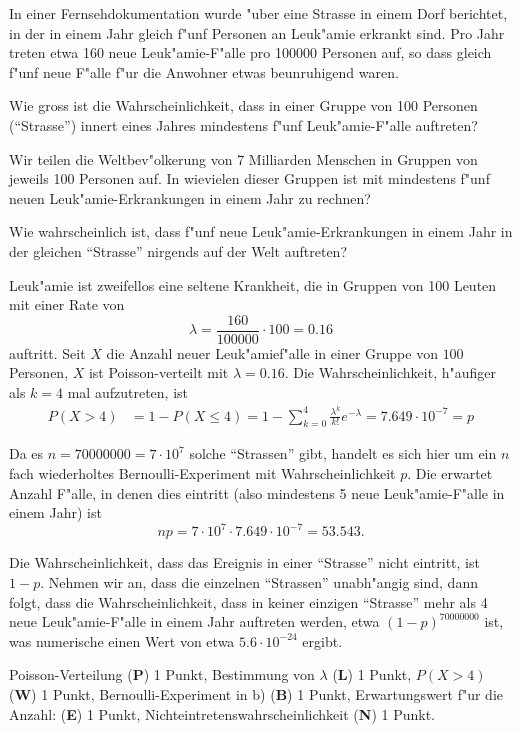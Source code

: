 In einer Fernsehdokumentation wurde "uber eine Strasse in einem Dorf berichtet,
in der in einem Jahr gleich f"unf Personen an Leuk"amie erkrankt sind.
Pro Jahr treten etwa 160 neue Leuk"amie-F"alle pro 100000 Personen auf,
so dass gleich f"unf neue F"alle f"ur die Anwohner etwas beunruhigend
waren.
\begin{teilaufgaben}
\item
Wie gross ist die Wahrscheinlichkeit, dass in einer Gruppe von
100 Personen (``Strasse'') innert eines Jahres mindestens f"unf
Leuk"amie-F"alle auftreten?
\item
Wir teilen die Weltbev"olkerung von 7 Milliarden Menschen
in Gruppen von jeweils 100 Personen auf.
In wievielen dieser Gruppen ist mit mindestens f"unf neuen
Leuk"amie-Erkrankungen in einem Jahr zu rechnen?
\item
Wie wahrscheinlich ist, dass f"unf neue Leuk"amie-Erkrankungen in einem 
Jahr in der gleichen ``Strasse'' nirgends auf der Welt auftreten?
\end{teilaufgaben}

\begin{loesung}
\begin{teilaufgaben}
\item
Leuk"amie ist zweifellos eine seltene Krankheit, die in Gruppen von 
100 Leuten mit einer Rate von 
\[
\lambda = \frac{160}{100000}\cdot 100=0.16
\]
auftritt.
Seit $X$ die Anzahl neuer Leuk"amief"alle in einer Gruppe von $100$
Personen, $X$ ist Poisson-verteilt mit $\lambda=0.16$.
Die Wahrscheinlichkeit, h"aufiger als $k=4$ mal aufzutreten, ist
\begin{align*}
P(X>4)
&=
1-P(X\le 4)
=
1-\sum_{k=0}^4 \frac{\lambda^k}{k!}e^{-\lambda}
=
7.649\cdot10^{-7}=p
\end{align*}
\item
Da es $n=70000000=7\cdot 10^7$ solche ``Strassen'' gibt, handelt es sich hier um
ein $n$ fach wiederholtes Bernoulli-Experiment mit Wahrscheinlichkeit $p$.
Die erwartet Anzahl F"alle, in denen dies eintritt (also mindestens 5
neue Leuk"amie-F"alle in einem Jahr) ist
\[
np=7\cdot 10^7\cdot 7.649\cdot 10^{-7}=53.543.
\]
\item
Die Wahrscheinlichkeit, dass das Ereignis in einer ``Strasse'' nicht eintritt,
ist $1-p$.
Nehmen wir an, dass die einzelnen ``Strassen'' unabh"angig sind, dann
folgt, dass die Wahrscheinlichkeit, dass in keiner einzigen ``Strasse''
mehr als 4 neue Leuk"amie-F"alle in einem Jahr auftreten werden, 
etwa $(1-p)^{70000000}$ ist, was numerische einen Wert von etwa
$5.6\cdot 10^{-24}$ ergibt.
\qedhere
\end{teilaufgaben}
\end{loesung}

\begin{bewertung}
Poisson-Verteilung ({\bf P}) 1 Punkt,
Bestimmung von $\lambda$ ({\bf L}) 1 Punkt,
$P(X>4)$ ({\bf W}) 1 Punkt,
Bernoulli-Experiment in b) ({\bf B}) 1 Punkt,
Erwartungswert f"ur die Anzahl: ({\bf E}) 1 Punkt,
Nichteintretenswahrscheinlichkeit ({\bf N}) 1 Punkt.
\end{bewertung}




